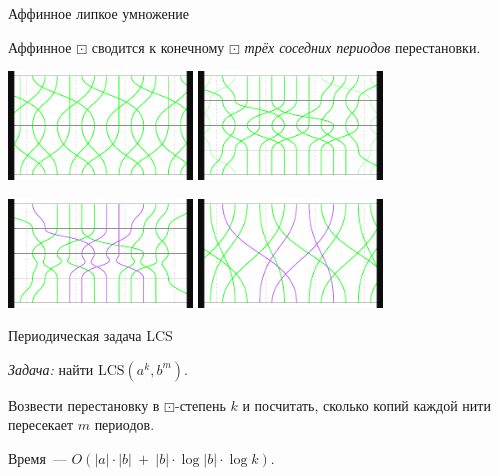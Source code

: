 \documentclass[svgnames]{beamer}
\begin{document}
\begin{frame}{Аффинное липкое умножение}

Аффинное \(\boxdot\) сводится к конечному \(\boxdot\) {\it трёх соседних периодов} перестановки.

\begin{center}
  \includegraphics[width=4.9cm]{img-fg/PQ-base} \hspace{4mm}
  \includegraphics[width=4.9cm]{img-fg/PQ-GF3n} \vspace{2mm}

  \includegraphics[width=4.9cm]{img-fg/PQ-GF3n-untg} \hspace{4mm}
  \includegraphics[width=4.9cm]{img-fg/PQ-GF3n-z}  
\end{center}

\end{frame}


\begin{frame}{Периодическая задача LCS}

\begin{block}{\vspace*{-3ex}}
{\it Задача:} найти \(\mathrm{LCS} (a^k, b^m)\).
\end{block} \vspace{4mm}

Возвести перестановку в \(\boxdot\)-степень \(k\) и посчитать, сколько копий каждой нити пересекает \(m\) периодов. \vspace{4mm}

Время~— \(O (|a| \cdot |b|\ +\ |b| \cdot \log |b| \cdot \log k)\).

\end{frame}
\end{document}
